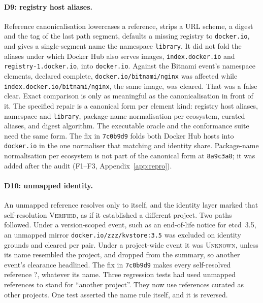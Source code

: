 \documentclass[11pt,a4paper]{article}
\newcommand{\code}[1]{\texttt{#1}}
\newcommand{\Ind}{\textsf{?}}
\newcommand{\dninecommit}{\code{7c0b9d9}}
\newcommand{\pincommit}{\code{8a9c3a8}}
\begin{document}
\paragraph{D9: registry host aliases.} Reference canonicalisation
lowercases a reference, strips a URL scheme, a digest and the tag of
the last path segment, defaults a missing registry to \code{docker.io},
and gives a single-segment name the namespace \code{library}. It did
not fold the aliases under which Docker Hub also serves images,
\code{index.docker.io} and \code{registry-1.docker.io}, into
\code{docker.io}. Against the Bitnami event's namespace elements,
declared complete, \code{docker.io/bitnami/nginx} was affected while
\code{index.docker.io/bitnami/nginx}, the same image, was cleared. That
was a false clear. Exact comparison is only as meaningful as the
canonicalisation in front of it. The specified repair is a canonical form per
element kind: registry host aliases, namespace and \code{library},
package-name normalisation per ecosystem, curated aliases, and digest
algorithm. The executable oracle and the conformance suite need the
same form. The fix in \dninecommit{} folds both Docker Hub hosts into
\code{docker.io} in the one normaliser that matching and identity
share. Package-name normalisation per ecosystem is not part of the
canonical form at \pincommit{}; it was added after the audit (F1--F3,
Appendix~\ref{app:repro}).

\paragraph{D10: unmapped identity.} An unmapped reference resolves only
to itself, and the identity layer marked that self-resolution
\textsc{Verified}, as if it established a different project. Two paths
followed. Under a version-scoped event, such as an end-of-life notice
for etcd~3.5, an unmapped mirror \code{docker.io/zzz/kvstore:3.5} was
excluded on identity grounds and cleared per pair. Under a project-wide
event it was \textsc{Unknown}, unless its name resembled the project,
and dropped from the summary, so another event's clearance headlined.
The fix in \dninecommit{} makes every self-resolved reference \Ind{},
whatever its name. Three regression tests had used unmapped references
to stand for ``another project''. They now use references curated as
other projects. One test asserted the name rule itself, and it is
reversed.
\end{document}
